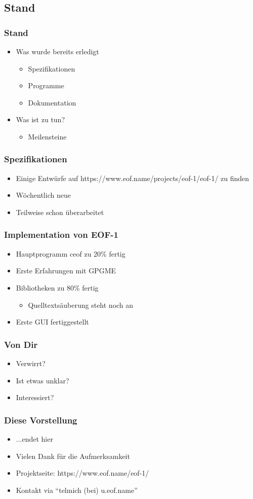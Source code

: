 \documentclass{beamer}
\begin{document}
\subsection{Stand}
\frame
{
  \frametitle{Stand}

  \begin{itemize}
  \item Was wurde bereits erledigt
  \pause
  \begin{itemize}
  \item Spezifikationen
  \pause
  \item Programme
  \pause
  \item Dokumentation
  \pause
  \end{itemize}
  \item Was ist zu tun?
  \begin{itemize}
  \pause
  \item Meilensteine
  \end{itemize}
  \end{itemize}
}

\frame
{
  \frametitle{Spezifikationen}

  \begin{itemize}
  \item Einige Entw\"urfe auf https://www.eof.name/projects/eof-1/eof-1/ zu finden
  \pause
  \item W\"ochentlich neue
  \pause
  \item Teilweise schon \"uberarbeitet
  \end{itemize}
}

\frame
{
  \frametitle{Implementation von EOF-1}

  \begin{itemize}
  \item Hauptprogramm ceof zu 20\% fertig
  \pause
  \item Erste Erfahrungen mit GPGME 
  \pause
  \item Bibliotheken zu 80\% fertig
  \pause
  \begin{itemize}
  \item Quelltexts\"auberung steht noch an
  \pause
  \end{itemize}
  \item Erste GUI fertiggestellt
  \end{itemize}
}

\frame
{
  \frametitle{Von Dir}

  \begin{itemize}
  \item Verwirrt?
  \pause
  \item Ist etwas unklar?
  \pause
  \item Interessiert?
  \end{itemize}
}

\frame
{
  \frametitle{Diese Vorstellung}

  \begin{itemize}
  \item ...endet hier
  \pause
  \item Vielen Dank f\"ur die Aufmerksamkeit
  \pause
  \item Projektseite: https://www.eof.name/eof-1/
  \pause
  \item Kontakt via "`telmich (bei) u.eof.name"'
  \end{itemize}
}
\end{document}
